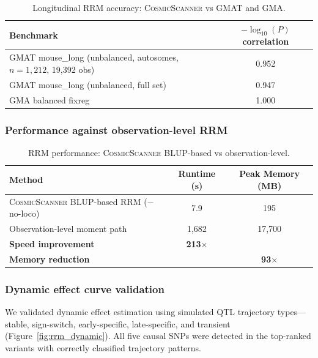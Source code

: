 \documentclass[11pt,a4paper]{article}
\newcommand{\CosmicScanner}{\textsc{CosmicScanner}}
\begin{document}
\begin{table}[H]
  \centering
  \caption{Longitudinal RRM accuracy: \CosmicScanner{} vs GMAT and GMA.}
  \label{tab:rrm_accuracy}
  \begin{threeparttable}
  \begin{tabular}{lc}
  \toprule
  Benchmark & $-\log_{10}(P)$ correlation \\
  \midrule
  GMAT mouse\_long (unbalanced, autosomes, $n=1{,}212$, 19,392 obs) & 0.952 \\
  GMAT mouse\_long (unbalanced, full set) & 0.947 \\
  GMA balanced fixreg & 1.000 \\
  \bottomrule
  \end{tabular}
  \end{threeparttable}
\end{table}

\subsubsection{Performance against observation-level RRM}

\begin{table}[H]
  \centering
  \caption{RRM performance: \CosmicScanner{} BLUP-based vs observation-level.}
  \label{tab:rrm_perf}
  \begin{threeparttable}
  \begin{tabular}{lcc}
  \toprule
  Method & Runtime (s) & Peak Memory (MB) \\
  \midrule
  \CosmicScanner{} BLUP-based RRM ($-$no-loco) & 7.9 & 195 \\
  Observation-level moment path & 1,682 & 17,700 \\
  \textbf{Speed improvement} & \textbf{213$\times$} & \\
  \textbf{Memory reduction} & & \textbf{93$\times$} \\
  \bottomrule
  \end{tabular}
  \end{threeparttable}
\end{table}

\subsubsection{Dynamic effect curve validation}

We validated dynamic effect estimation using simulated QTL trajectory types---stable, sign-switch, early-specific, late-specific, and transient (Figure~\ref{fig:rrm_dynamic}). All five causal SNPs were detected in the top-ranked variants with correctly classified trajectory patterns.
\end{document}
